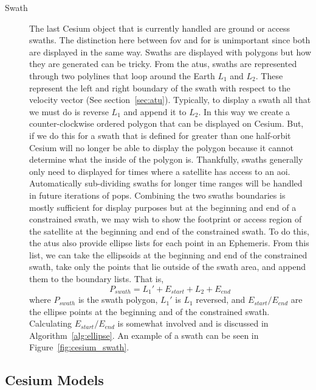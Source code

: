 \begin{description}
    \item[Swath] The last Cesium object that is currently handled are ground or
	access swaths. The distinction here between \gls{fov} and \gls{for} is
	unimportant since both are displayed in the same way. Swaths are
	displayed with polygons but how they are generated can be tricky. From
	the \glspl{atu}, swaths are represented through two polylines that loop
	around the Earth $L_1$ and $L_2$. These represent the left and right
	boundary of the swath with respect to the velocity vector (See
	section~\ref{sec:atu}).  Typically, to display a swath all that we must
	do is reverse $L_1$ and append it to $L_2$. In this way we create a
	counter-clockwise ordered polygon that can be displayed on Cesium. But,
	if we do this for a swath that is defined for greater than one
	half-orbit Cesium will no longer be able to display the polygon because
	it cannot determine what the inside of the polygon is. Thankfully,
	swaths generally only need to displayed for times where a satellite has
	access to an \gls{aoi}. Automatically sub-dividing swaths for longer
	time ranges will be handled in future iterations of \gls{pops}.
	Combining the two swaths boundaries is mostly sufficient for display
	purposes but at the beginning and end of a constrained swath, we may
	wish to show the footprint or access region of the satellite at the
	beginning and end of the constrained swath. To do this, the \glspl{atu}
	also provide ellipse lists for each point in an Ephemeris. From this
	list, we can take the ellipsoids at the beginning and end of the
	constrained swath, take only the points that lie outside of the swath
	area, and append them to the boundary lists. That is,
	\begin{equation*} 
	    P_{swath} = L_1' + E_{start} + L_2 + E_{end}
	\end{equation*} where $P_{swath}$ is the swath polygon, $L_1'$ is $L_1$
	reversed, and $E_{start}/E_{end}$ are the ellipse points at the
	beginning and of the constrained swath. Calculating $E_{start}/E_{end}$
	is somewhat involved and is discussed in Algorithm~\ref{alg:ellipse}.
	An example of a swath can be seen in Figure~\ref{fig:cesium_swath}.

\end{description}


\subsection{Cesium Models}

